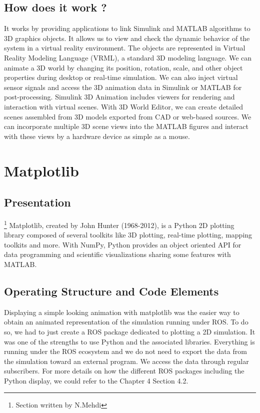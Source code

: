 \documentclass[a4paper]{report}
\begin{document}
\subsection{How does it work ?}

It works by providing applications to link Simulink and MATLAB algorithms to 3D graphics objects. It allows us to view and check the dynamic behavior of the system in a virtual reality environment. The objects are represented in Virtual Reality Modeling Language (VRML), a standard 3D modeling language. We can animate a 3D world by changing its position, rotation, scale, and other object properties during desktop or real-time simulation. We can also inject virtual sensor signals and access the 3D animation data in Simulink or MATLAB for post-processing. Simulink 3D Animation includes viewers for rendering and interaction with virtual scenes. With 3D World Editor, we can create detailed scenes assembled from 3D models exported from CAD or web-based sources. We can incorporate multiple 3D scene views into the MATLAB figures and interact with these views by a hardware device as simple as a mouse.

\section{Matplotlib}

\subsection{Presentation}
\footnote{Section written by N.Mehdi } 
Matplotlib, created by John Hunter (1968-2012), is a Python 2D plotting library composed of several toolkits like 3D plotting, real-time plotting, mapping toolkits and more. With NumPy, Python provides an object oriented API for data programming and scientific visualizations sharing some features with MATLAB.

\subsection{Operating Structure and Code Elements}

Displaying a simple looking animation with matplotlib was the easier way to obtain an animated representation of the simulation running under ROS. To do so, we had to just create a ROS package dedicated to plotting a 2D simulation. It was one of the strengths to use Python and the associated libraries. Everything is running under the ROS ecosystem and we do not need to export the data from the simulation toward an external program. We access the data through regular subscribers.
For more details on how the different ROS packages including the Python display, we could refer to the Chapter 4 Section 4.2. 
\end{document}
